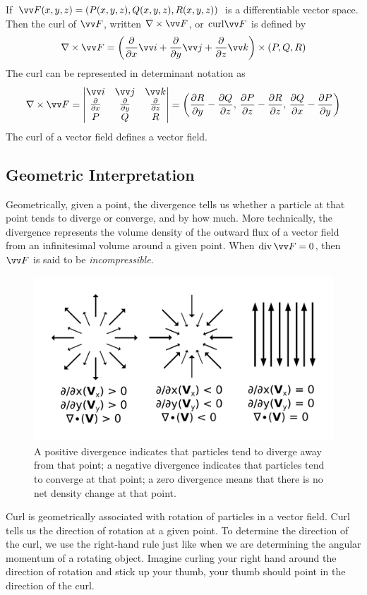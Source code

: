 \begin{definition}[Curl]
If $\vv F (x,y,z) = (P(x,y,z), Q(x,y,z), R(x,y,z))$ is a differentiable vector space. Then the curl of $\vv F$, written $\nabla \times \vv F$, or $\mathrm{curl} \vv F$ is defined by
$$
\nabla \times \vv F = \left( \partialderiv{}{x}\vv i + \partialderiv{}{y}\vv j + \partialderiv{}{z}\vv k \right) \times (P,Q,R)
$$
The curl can be represented in determinant notation as
$$
\nabla \times \vv F = \begin{vmatrix}
\vv i & \vv j & \vv k \\
\partialderiv{}{x} & \partialderiv{}{y} & \partialderiv{}{z} \\
P & Q & R
\end{vmatrix} = \left(\partialderiv{R}{y}-\partialderiv{Q}{z},\, \partialderiv{P}{z}-\partialderiv{R}{z},\, \partialderiv{Q}{x}-\partialderiv{P}{y} \right)
$$
The curl of a vector field defines a vector field.
\end{definition}

\subsection{Geometric Interpretation}
Geometrically, given a point, the divergence tells us whether a particle at that point tends to diverge or converge, and by how much. More technically, the divergence represents the volume density of the outward flux of a vector field from an infinitesimal volume around a given point. When $\Div \vv F = 0$, then $\vv F$ is said to be \textit{incompressible}.

\begin{figure}[h]
    \centering
    \includegraphics[width=0.5\linewidth]{figures/divergence.png}
    \caption{A positive divergence indicates that particles tend to diverge away from that point; a negative divergence indicates that particles tend to converge at that point; a zero divergence means that there is no net density change at that point.}
    \label{fig:divergence}
\end{figure}

Curl is geometrically associated with rotation of particles in a vector field. Curl tells us the direction of rotation at a given point. To determine the direction of the curl, we use the right-hand rule just like when we are determining the angular momentum of a rotating object. Imagine curling your right hand around the direction of rotation and stick up your thumb, your thumb should point in the direction of the curl.

